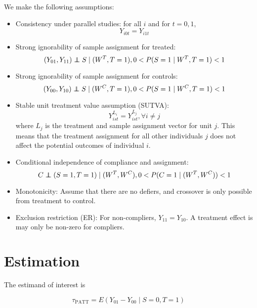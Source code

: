 \documentclass{article}
\newcommand{\pr}{P} %
\newcommand{\ex}{E} %
\newcommand\independent{\protect\mathpalette{\protect\independenT}{\perp}}
\def\independenT#1#2{\mathrel{\rlap{$#1#2$}\mkern2mu{#1#2}}}
\begin{document}
We make the following assumptions:
\begin{itemize}
\item{Consistency under parallel studies: for all $i$ and for $t=0, 1$,
\begin{equation}\label{consistency}
Y_{i0t} = Y_{i1t}
\end{equation}}
\item{Strong ignorability of sample assignment for treated:
\begin{equation}\label{si_treat}
(Y_{01}, Y_{11}) \independent S \mid (W^T, T=1), 0 < \pr(S=1 \mid W^T, T=1) <1 
\end{equation}}
\item{Strong ignorability of sample assignment for controls:
\begin{equation}\label{si_ctrl}
(Y_{00}, Y_{10}) \independent S \mid (W^C, T=1), 0 < \pr(S=1 \mid W^C, T=1) <1 
\end{equation}}
\item{Stable unit treatment value assumption (SUTVA):
\begin{equation}\label{sutva}
Y_{ist}^{L_i} = Y_{ist}^{L_j},  \forall i \neq j
\end{equation}
where $L_j$ is the treatment and sample assignment vector for unit $j$.  This means that the treatment assignment for all other individuals $j$ does not affect the potential outcomes of individual $i$.}
\item{Conditional independence of compliance and assignment:
\begin{equation}\label{compl}
C \independent (S=1, T=1) \mid (W^T, W^C), 0 < \pr(C = 1 \mid (W^T, W^C)) < 1
\end{equation}
}
\item{Monotonicity: Assume that there are no defiers, and crossover is only possible from treatment to control.}
\item{Exclusion restriction (ER): For non-compliers, $Y_{11} = Y_{10}$.  A treatment effect is may only be non-zero for compliers.}
\end{itemize}




\section{Estimation}

The estimand of interest is 

\begin{equation}
\tau_{\text{PATT}} = \ex\left( Y_{01} - Y_{00} \mid S=0, T=1\right)
\end{equation}
\end{document}
